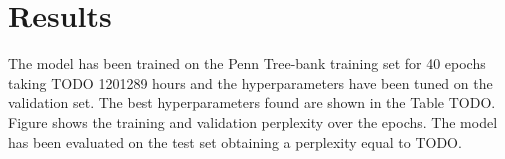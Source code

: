 \section{Results}
The model has been trained on the Penn Tree-bank training set for 40 epochs 
taking TODO 1201289 hours and the hyperparameters have been tuned on the 
validation set. The best hyperparameters found are shown in the Table TODO.
Figure shows the training and validation perplexity over the epochs. 
The model has been evaluated on the test set obtaining a perplexity equal 
to TODO.
